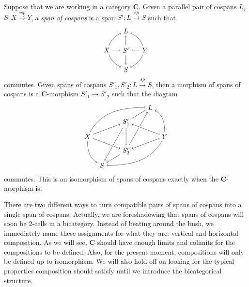 \documentclass[11pt]{amsart}
\newcommand{\cat}[1]{\mathbf{#1}}
\newcommand{\from}{\colon}
\renewcommand{\span}{\xrightarrow{\mathit{sp}}}
\newcommand{\cospan}{\xrightarrow{\mathit{csp}}}
\theoremstyle{remark}
\theoremstyle{definition}
\begin{document}
Suppose that we are working in a category $\cat{C}$. Given a parallel pair of cospans $L$, $S \from X \cospan Y$, a \emph{span of cospans} is a span $S' \from L \span S$ such that
\[
\begin{tikzpicture}
\node (a) at (0,1) {$L$};
\node (b) at (1,0) {$Y$};
\node (c) at (0,-1) {$S$};
\node (d) at (-1,0) {$X$};
\node (e) at (0,0) {$S'$};
%
\draw [<-] (a) edge[bend left=20] (b);
\draw [->] (b) edge[bend left=20] (c);
\draw [<-] (c) edge[bend left=20] (d);
\draw [->] (d) edge[bend left=20] (a);
\draw [<-] (a) edge (e);
\draw [->] (b) edge (e);
\draw [<-] (c) edge (e);
\draw [->] (d) edge (e);
\end{tikzpicture}
\]
commutes. Given spans of cospans $S'_1,S'_2 \from L \span S$, then a morphism of spans of cospans is a $\cat{C}$-morphism $S'_1 \to S'_2$ such that the diagram
%
\begin{equation} 
\label{diag.2-cell iso}
\begin{tikzpicture}[baseline=(current  bounding  box.center)]
	\node (X) at (-2,0) {$X$};
	\node (L) at (1.25,1.5) {$L$};
	\node (Y) at (2,0) {$Y$};
	\node (S) at (-1.25,-1.5) {$S$};
	\node (S'1) at (0,0.75) {$S'_1$};
	\node (S'2) at (0,-0.75) {$S'_2$};
	\draw [->] (X) edge[in=180,out=60] (L);
	\draw [->] (X) edge[] (S'1);
	\draw [->] (X) edge[] (S'2);
	\draw [->] (X) edge[out=-90,in=150] (S);
	\draw [->] (Y) edge[out=90,in=-30] (L);
	\draw [->] (Y) edge[] (S'2);
	\draw [->] (Y) edge[out=-120,in=0] (S);
	\draw [->] (S'1) edge[] (L);
	\draw [->] (S'1) edge[white,line width=3.5pt] (S);
	\draw [->] (S'1) edge[] (S);
	\draw [->] (S'1) edge[] (S'2);
	\draw [->] (S'2) edge[] (L);
	\draw [->] (S'2) edge[] (S);
	\draw [->] (Y) edge[white,line width=3.5pt] (S'1);
	\draw [->] (Y) edge[] (S'1);
\end{tikzpicture}
\end{equation}
commutes. This is an isomorphism of spans of  cospans exactly when the  $\cat{C}$-morphism is.

There are two different ways to turn compatible pairs of spans of cospans into a single span of cospans.  Actually, we are foreshadowing that spans of cospans will soon be $2$-cells in a bicategory. Instead of beating around the bush, we immediately name these assignments for what they are: vertical and horizontal composition. As we will see, $\cat{C}$ should have enough limits and colimits for the compositions to be defined. Also, for the present moment, compositions will only be defined up to isomorphism. We will also hold off on looking for the typical properties composition should satisfy until we introduce the bicategorical structure. 
\end{document}
